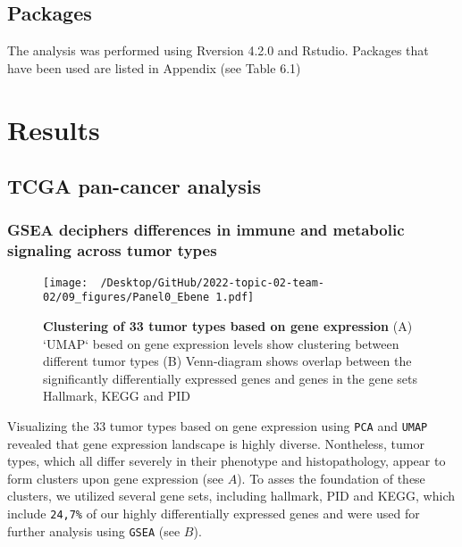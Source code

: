 \documentclass[
  parskip,
  openany]{scrreprt}
\begin{document}
\hypertarget{packages}{%
\section{Packages}\label{packages}}

The analysis was performed using Rversion 4.2.0 and Rstudio. Packages
that have been used are listed in Appendix (see Table 6.1)

\hypertarget{results}{%
\chapter{Results}\label{results}}

\hypertarget{tcga-pan-cancer-analysis-1}{%
\section{TCGA pan-cancer analysis}\label{tcga-pan-cancer-analysis-1}}

\hypertarget{gsea-deciphers-differences-in-immune-and-metabolic-signaling-across-tumor-types}{%
\subsection{GSEA deciphers differences in immune and metabolic signaling
across tumor
types}\label{gsea-deciphers-differences-in-immune-and-metabolic-signaling-across-tumor-types}}

\begin{figure}[h]
 \begin{center}
   \texttt{[image: ~/Desktop/GitHub/2022-topic-02-team-02/09\_figures/Panel0\_Ebene 1.pdf]}
  \end{center}
  \caption{\textbf{Clustering of 33 tumor types based on gene expression} (A) `UMAP` besed on gene expression levels show clustering between different tumor types (B) Venn-diagram shows overlap between the significantly differentially expressed genes and genes in the gene sets Hallmark, KEGG and PID}
  \label{UMAP}
\end{figure}

Visualizing the 33 tumor types based on gene expression using
\texttt{PCA} and \texttt{UMAP} revealed that gene expression landscape
is highly diverse. Nontheless, tumor types, which all differ severely in
their phenotype and histopathology, appear to form clusters upon gene
expression (see  \(A\)). To asses the foundation of these
clusters, we utilized several gene sets, including hallmark, PID and
KEGG, which include \texttt{24,7\%} of our highly differentially
expressed genes and were used for further analysis using \texttt{GSEA}
(see  \(B\)).
\end{document}
